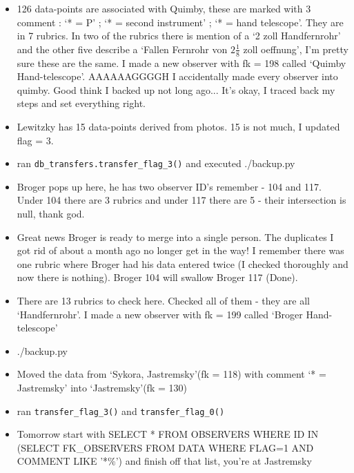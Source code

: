 \documentclass[12pt]{article}
\begin{document}
\begin{itemize}
    \item 126 data-points are associated with Quimby, these are marked with 3 comment : `* = P' ; `* = second instrument' ; `* = hand telescope'. They are in 7 rubrics. In two of the rubrics there is mention of a `2 zoll Handfernrohr' and the other five describe a `Fallen Fernrohr von $2\frac{1}{8}$ zoll oeffnung', I'm pretty sure these are the same. I made a new observer with fk = 198 called `Quimby Hand-telescope'. AAAAAAGGGGH I accidentally made every observer into quimby. Good think I backed up not long ago... It's okay, I traced back my steps and set everything right.
    \item Lewitzky has 15 data-points derived from photos. 15 is not much, I updated flag = 3.
    \item ran \texttt{db\_transfers.transfer\_flag\_3()} and executed ./backup.py
    \item Broger pops up here, he has two observer ID's remember - 104 and 117. Under 104 there are 3 rubrics and under 117 there are 5 - their intersection is null, thank god. 
    \item Great news Broger is ready to merge into a single person. The duplicates I got rid of about a month ago no longer get in the way! I remember there was one rubric where Broger had his data entered twice (I checked thoroughly and now there is nothing). Broger 104 will swallow Broger 117 (Done).
    \item There are 13 rubrics to check here. Checked all of them - they are all `Handfernrohr'. I made a new observer with fk = 199 called `Broger Hand-telescope'
    \item ./backup.py
    \item Moved the data from `Sykora, Jastremsky'(fk = 118) with comment `* = Jastremsky' into `Jastremsky'(fk = 130)
    \item ran \texttt{transfer\_flag\_3()} and \texttt{transfer\_flag\_0()}
    \item Tomorrow start with SELECT * FROM OBSERVERS WHERE ID IN (SELECT FK\_OBSERVERS FROM DATA WHERE FLAG=1 AND COMMENT LIKE '*\%') and finish off that list, you're at Jastremsky
\end{itemize}
\end{document}
